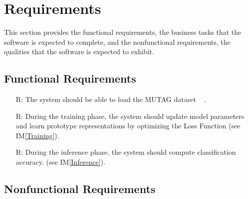 \documentclass[12pt]{article}
\newcommand{\iref}[1]{IM\ref{#1}}
\newcounter{reqnum} %
\begin{document}
\section{Requirements}

This section provides the functional requirements, the business tasks that the
software is expected to complete, and the nonfunctional requirements, the
qualities that the software is expected to exhibit.

\subsection{Functional Requirements}

\noindent \begin{itemize}

\item[R\refstepcounter{reqnum}\thereqnum \label{R_Inputs}:] The system should be able to load the MUTAG dataset ~\cite{debnath1991structure} .

\item[R\refstepcounter{reqnum}\thereqnum \label{R_Train}:] During the training phase, the system should update model parameters and learn prototype representations by optimizing the Loss Function (see \iref{Training}).

\item[R\refstepcounter{reqnum}\thereqnum \label{R_VerifyOutput}:] During the inference phase, the system should compute classification accuracy. (see \iref{Inference}).


\end{itemize}


\subsection{Nonfunctional Requirements}
\end{document}

